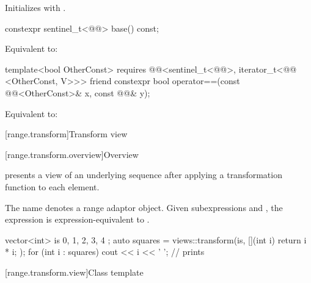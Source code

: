 \begin{itemdescr}
\pnum
\effects
Initializes  with .
\end{itemdescr}

%
\begin{itemdecl}
constexpr sentinel_t<@@> base() const;
\end{itemdecl}

\begin{itemdescr}
\pnum
\effects
Equivalent to: 
\end{itemdescr}

%
\begin{itemdecl}
template<bool OtherConst>
  requires @@<sentinel_t<@@>, iterator_t<@@ <OtherConst, V>>>
  friend constexpr bool operator==(const @@<OtherConst>& x, const @@& y);
\end{itemdecl}

\begin{itemdescr}
\pnum
\effects
Equivalent to: 
\end{itemdescr}

[range.transform]{Transform view}

[range.transform.overview]{Overview}

\pnum
{} presents
a view of an underlying sequence after
applying a transformation function to each element.

\pnum
{}%
The name  denotes a
range adaptor object.
Given subexpressions  and , the expression
 is expression-equivalent to
.

\pnum
\begin{example}
\begin{codeblock}
vector<int> is{ 0, 1, 2, 3, 4 };
auto squares = views::transform(is, [](int i) { return i * i; });
for (int i : squares)
  cout << i << ' '; // prints 
\end{codeblock}
\end{example}

[range.transform.view]{Class template }

